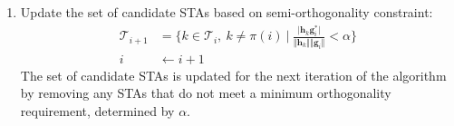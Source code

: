 \begin{enumerate}
    \item Update the set of candidate STAs based on semi-orthogonality constraint:
    \begin{subequations}
        \begin{align}
            \mathcal{T}_{i+1} &= \bigg\lbrace k\in \mathcal{T}_i,\ k\neq \pi(i)\ \big \vert \ \frac{\vert \textbf{h}_k\textbf{g}_i^*\vert}{\Vert \textbf{h}_k \Vert \Vert \textbf{g}_i\Vert} < \alpha  \bigg\rbrace \\
            i &\longleftarrow i+1
        \end{align}
    \end{subequations}
    The set of candidate STAs is updated for the next iteration of the algorithm by  removing any STAs that do not meet a minimum orthogonality requirement, determined by $\alpha$.
\end{enumerate}
